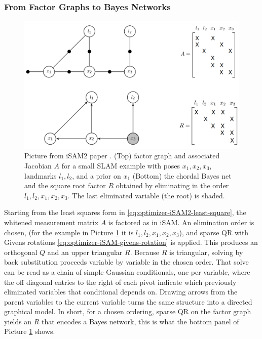 \subsubsection{From Factor Graphs to Bayes Networks}
\begin{figure}[H]
    \centering
    \includegraphics[width=0.98\linewidth]{Pictures/Optimizers/iSAM2/Factor_graph_to_Bayes_network.png}
    \caption{Picture from iSAM2 paper \cite{iSAM2_paper}. (Top) factor graph and associated Jacobian $A$ for a small SLAM example with poses $x_1,x_2,x_3$, landmarks $l_1,l_2$, and a prior on $x_1$ (Bottom) the chordal Bayes net and the square root factor $R$ obtained by eliminating in the order $l_1,l_2,x_1,x_2,x_3$. The last eliminated variable (the root) is shaded. \cite{iSAM2_paper}}
    \label{fig:optimizer-iSAM2-factor-graph-to-bayes-netwrok}
\end{figure}
\noindent
Starting from the least squares form in \eqref{eq:optimizer-iSAM2-least-square}, the whitened measurement matrix $A$ is factored as in iSAM. An elimination order is chosen, (for the example in Picture \ref{fig:optimizer-iSAM2-factor-graph-to-bayes-netwrok} it is $l_1,l_2,x_1,x_2,x_3$), and sparse QR with Givens rotations \eqref{eq:optimizer-iSAM-givens-rotation} is applied. This produces an orthogonal $Q$ and an upper triangular $R$. Because $R$ is triangular, solving by back substitution proceeds variable by variable in the chosen order. That solve can be read as a chain of simple Gaussian conditionals, one per variable, where the off diagonal entries to the right of each pivot indicate which previously eliminated variables that conditional depends on. Drawing arrows from the parent variables to the current variable turns the same structure into a directed graphical model. In short, for a chosen ordering, sparse QR on the factor graph yields an $R$ that encodes a Bayes network, this is what the bottom panel of Picture \ref{fig:optimizer-iSAM2-factor-graph-to-bayes-netwrok} shows.

